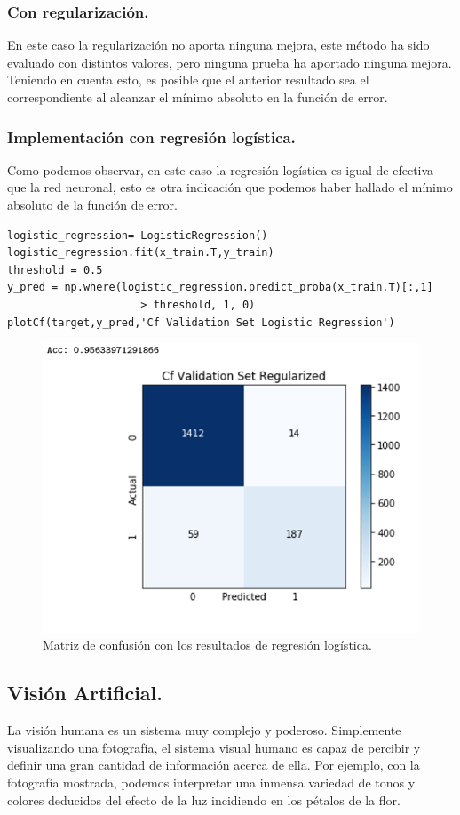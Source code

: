 \documentclass[a4paper,11pt]{article}
\begin{document}
\subsubsection{Con regularización.}
En este caso la regularización no aporta ninguna mejora, este método ha sido evaluado con distintos valores, pero ninguna prueba ha aportado ninguna mejora. Teniendo en cuenta esto, es posible que el anterior resultado sea el correspondiente al alcanzar el mínimo absoluto en la función de error.

\subsubsection{Implementación con regresión logística.}
Como podemos observar, en este caso la regresión logística es igual de efectiva que la red neuronal, esto es otra indicación que podemos haber hallado el mínimo absoluto de la función de error.
\begin{lstlisting}
logistic_regression= LogisticRegression()
logistic_regression.fit(x_train.T,y_train)
threshold = 0.5
y_pred = np.where(logistic_regression.predict_proba(x_train.T)[:,1]
					 > threshold, 1, 0)
plotCf(target,y_pred,'Cf Validation Set Logistic Regression')
\end{lstlisting}
\begin{figure}[H]
\centering
\includegraphics[scale=0.6]{Annotation 2020-03-23 161410}
\caption{Matriz de confusión con los resultados de regresión logística.}
\end{figure}
\newpage
\subsection{Visión Artificial.}
La visión humana es un sistema muy complejo y poderoso. Simplemente
visualizando una fotografía, el sistema visual humano es capaz
de percibir y definir una gran cantidad de información acerca de ella. Por ejemplo, con la fotografía mostrada, podemos interpretar una inmensa variedad de tonos y colores deducidos del efecto de la luz incidiendo en los pétalos de la flor.\\
\end{document}
